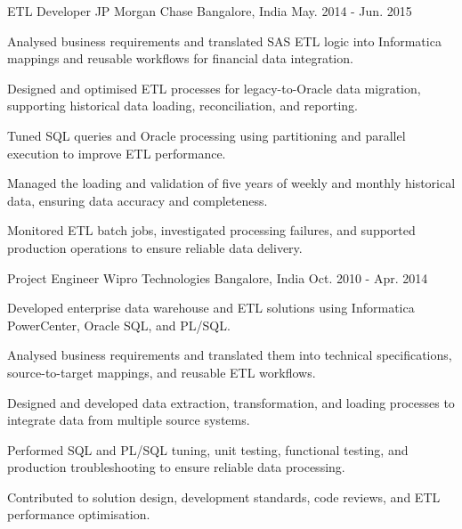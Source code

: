 \begin{cventries}
  \cventry
  {ETL Developer} %
  {JP Morgan Chase} %
  {Bangalore, India} %
  {May. 2014 - Jun. 2015} %
  {
    \begin{cvitems} %
    \item {Analysed business requirements and translated SAS ETL logic into Informatica mappings and reusable workflows for financial data integration.}
    \item {Designed and optimised ETL processes for legacy-to-Oracle data migration, supporting historical data loading, reconciliation, and reporting.}
    \item {Tuned SQL queries and Oracle processing using partitioning and parallel execution to improve ETL performance.}
    \item {Managed the loading and validation of five years of weekly and monthly historical data, ensuring data accuracy and completeness.}
    \item {Monitored ETL batch jobs, investigated processing failures, and supported production operations to ensure reliable data delivery.}
    \end{cvitems}
  }

  \cventry
  {Project Engineer} %
  {Wipro Technologies} %
  {Bangalore, India} %
  {Oct. 2010 - Apr. 2014} %
  {
    \begin{cvitems} %
    \item{Developed enterprise data warehouse and ETL solutions using Informatica PowerCenter, Oracle SQL, and PL/SQL.}
    \item{Analysed business requirements and translated them into technical specifications, source-to-target mappings, and reusable ETL workflows.}
    \item{Designed and developed data extraction, transformation, and loading processes to integrate data from multiple source systems.}
    \item{Performed SQL and PL/SQL tuning, unit testing, functional testing, and production troubleshooting to ensure reliable data processing.}
    \item{Contributed to solution design, development standards, code reviews, and ETL performance optimisation.}
    \end{cvitems}
  }

\end{cventries}
